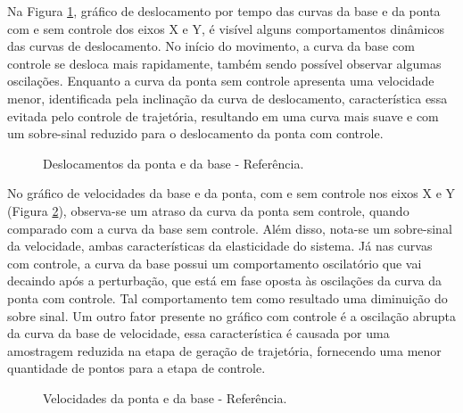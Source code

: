 Na Figura \ref{fig:ref_des}, gráfico de deslocamento por tempo das curvas da base e da ponta com e sem controle dos eixos X e Y, é visível alguns comportamentos dinâmicos das curvas de deslocamento. No início do movimento, a curva da base com controle se desloca mais rapidamente, também sendo possível observar algumas oscilações. Enquanto a curva da ponta sem controle apresenta uma velocidade menor, identificada pela inclinação da curva de deslocamento, característica essa evitada pelo controle de trajetória, resultando em uma curva mais suave e com um sobre-sinal reduzido para o deslocamento da ponta com controle.

\begin{figure}[H]
    \centering
    \hfill
    \caption{Deslocamentos da ponta e da base - Referência.}
    \label{fig:ref_des}
\end{figure}

No gráfico de velocidades da base e da ponta, com e sem controle nos eixos X e Y (Figura \ref{fig:ref_vel}), observa-se um atraso da curva da ponta sem controle, quando comparado com a curva da base sem controle. Além disso, nota-se um sobre-sinal da velocidade, ambas características da elasticidade do sistema.
Já nas curvas com controle, a curva da base possui um comportamento oscilatório que vai decaindo após a perturbação, que está em fase oposta às oscilações da curva da ponta com controle. Tal comportamento tem como resultado uma diminuição do sobre sinal. Um outro fator presente no gráfico com controle é a oscilação abrupta da curva da base de velocidade, essa característica é causada por uma amostragem reduzida na etapa de geração de trajetória, fornecendo uma menor quantidade de pontos para a etapa de controle.

\begin{figure}[H]
    \centering
    \hfill
    \caption{Velocidades da ponta e da base - Referência.}
    \label{fig:ref_vel}
\end{figure}

